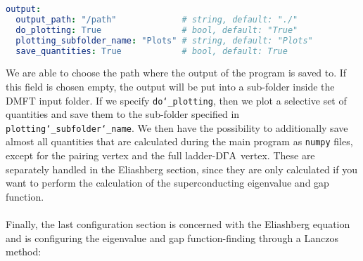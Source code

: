 \documentclass[\main/main.tex]{subfiles}
\begin{document}
\begin{minipage}{\textwidth}%
\begin{lstlisting}[language=yaml]
output:
  output_path: "/path"             # string, default: "./"
  do_plotting: True                # bool, default: "True"
  plotting_subfolder_name: "Plots" # string, default: "Plots"
  save_quantities: True            # bool, default: True
\end{lstlisting}
\end{minipage}
We are able to choose the path where the output of the program is saved to. If this field is chosen empty, the output will be put into a sub-folder inside the DMFT input folder. If we specify \texttt{do\char`_plotting}, then we plot a selective set of quantities and save them to the sub-folder specified in \texttt{plotting\char`_subfolder\char`_name}. We then have the possibility to additionally save almost all quantities that are calculated during the main program as \texttt{numpy} files, except for the pairing vertex and the full ladder-$\text{D}\Gamma\text{A}$ vertex. These are separately handled in the Eliashberg section, since they are only calculated if you want to perform the calculation of the superconducting eigenvalue and gap function.
\\\\
Finally, the last configuration section is concerned with the Eliashberg equation and is configuring the eigenvalue and gap function-finding through a Lanczos method:
\end{document}
